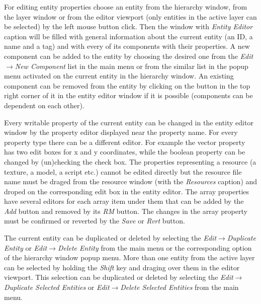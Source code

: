 For editing entity properties choose an entity from the hierarchy window, from the layer window or from the editor viewport (only entities in the active layer can be selected) by the left mouse button click. Then the window with \emph{Entity Editor} caption will be filled with general information about the current entity (an ID, a name and a tag) and with every of its components with their properties. A new component can be added to the entity by choosing the desired one from the \emph{Edit}$\rightarrow$\emph{New Component} list in the main menu or from the similar list in the popup menu activated on the current entity in the hierarchy window. An existing component can be removed from the entity by clicking on the button in the top right corner of it in the entity editor window if it is possible (components can be dependent on each other).

Every writable property of the current entity can be changed in the entity editor window by the property editor displayed near the property name. For every property type there can be a different editor. For example the vector property has two edit boxes for x and y coordinates, while the boolean property can be changed by (un)checking the check box. The properties representing a resource (a texture, a model, a script etc.) cannot be edited directly but the resource file name must be draged from the resource window (with the \emph{Resources} caption) and droped on the corresponding edit box in the entity editor. The array properties have several editors for each array item under them that can be added by the \emph{Add} button and removed by its \emph{RM} button. The changes in the array property must be confirmed or reverted by the \emph{Save} or \emph{Rvrt} button.


The current entity can be duplicated or deleted by selecting the \emph{Edit}$\rightarrow$\emph{Du\-pli\-ca\-te Entity} or \emph{Edit}$\rightarrow$\emph{Delete Entity} from the main menu or the corresponding option of the hierarchy window popup menu. More than one entity from the active layer can be selected by holding the \emph{Shift} key and draging over them in the editor viewport. This selection can be duplicated or deleted by selecting the \emph{Edit}$\rightarrow$\emph{Duplicate Selected Entities} or \emph{Edit}$\rightarrow$\emph{Delete Selected Entities} from the main menu.


